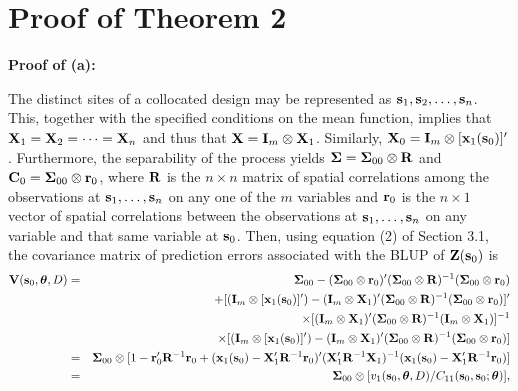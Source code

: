 \documentclass[12pt]{article}
\def\btheta{\mbox{\boldmath$\theta$}}
\def\bSigma{\mbox{\boldmath$\Sigma$}}
\begin{document}

\section{Proof of Theorem 2}
\normalsize

\noindent \textbf{Proof of (a):}\par
The distinct sites of a collocated design may be represented as ${\bf s}_1,{\bf s}_2,\ldots,{\bf s}_n$.  This, together with the specified conditions on the mean function, implies that ${\bf X}_1={\bf X}_2=\cdots={\bf X}_n$ and thus that ${\bf X}={\bf I}_m\otimes{\bf X}_1$.  Similarly, ${\bf X}_0={\bf I}_m\otimes[{\bf x}_1({\bf s}_0)]^{\prime}$.  Furthermore, the separability of the process yields $\bSigma=\bSigma_{00}\otimes{\bf R}$ and ${\bf C}_0=\bSigma_{00}\otimes{\bf r}_0$, where ${\bf R}$ is the $n\times n$ matrix of spatial correlations among the observations at ${\bf s}_1,\ldots,{\bf s}_n$ on any one of the $m$ variables and ${\bf r}_0$ is the $n\times 1$ vector of spatial correlations between the observations at ${\bf s}_1,\ldots,{\bf s}_n$ on any variable and that same variable at ${\bf s}_0$.  Then, using equation (2) of Section 3.1, the covariance matrix of prediction errors associated with the BLUP of ${\bf Z}({\bf s}_0)$ is
\begin{eqnarray*}
{\bf V}({\bf s}_{0},\btheta,D) & = & \bSigma_{00}-(\bSigma_{00}\otimes{\bf r}_0)^{\prime}
(\bSigma_{00}\otimes{\bf R})^{-1}(\bSigma_{00}\otimes{\bf r}_0) \\
& & +[({\bf I}_m\otimes[{\bf x}_1({\bf s}_0)]^{\prime})-({\bf I}_m\otimes{\bf X}_1)^{\prime}(\bSigma_{00}\otimes{\bf R})^{-1}(\bSigma_{00}\otimes{\bf r}_0)]^{\prime} \\
& & \times[({\bf I}_m\otimes{\bf X}_1)^{\prime}(\bSigma_{00}\otimes{\bf R})^{-1}({\bf I}_m\otimes{\bf X}_1)]^{-1} \\
& & \times[({\bf I}_m\otimes[{\bf x}_1({\bf s}_0)]^{\prime})-({\bf I}_m\otimes{\bf X}_1)^{\prime}(\bSigma_{00}\otimes{\bf R})^{-1}(\bSigma_{00}\otimes{\bf r}_0)] \\
& = & \bSigma_{00}\otimes[1-{\bf r}_0^{\prime}{\bf R}^{-1}{\bf r}_0+({\bf x}_1({\bf s}_0)-{\bf X}_1^{\prime}{\bf R}^{-1}{\bf r}_0)^{\prime}({\bf X}_1^{\prime}{\bf R}^{-1}{\bf X}_1)^{-1}({\bf x}_1({\bf s}_0)-{\bf X}_1^{\prime}{\bf R}^{-1}{\bf r}_0)] \\
& = & \bSigma_{00}\otimes[v_1({\bf s}_0,\btheta,D)/C_{11}({\bf s}_0,{\bf s}_0;\btheta)],
\end{eqnarray*}
\end{document}
